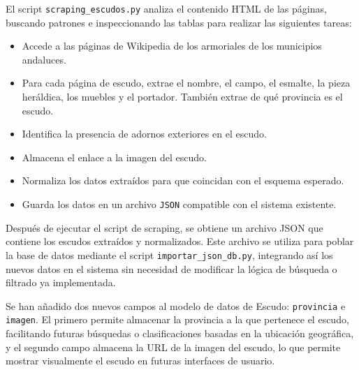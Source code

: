 El script \texttt{scraping{}\_escudos.py} analiza el contenido HTML de las páginas, buscando patrones e inspeccionando 
las tablas para realizar las siguientes tareas:

\begin{itemize}
    \item Accede a las páginas de Wikipedia de los armoriales de los municipios andaluces.
    \item Para cada página de escudo, extrae el nombre,  el campo, el esmalte, la pieza heráldica, los muebles y el 
    portador. También extrae de qué provincia es el escudo.
    \item Identifica la presencia de adornos exteriores en el escudo.
    \item Almacena el enlace a la imagen del escudo.
    \item Normaliza los datos extraídos para que coincidan con el esquema esperado.
    \item Guarda los datos en un archivo \texttt{JSON} compatible con el sistema existente.
\end{itemize}

Después de ejecutar el script de scraping, se obtiene un archivo JSON que contiene los escudos extraídos y normalizados. Este archivo se 
utiliza para poblar la base de datos mediante el script \texttt{importar{}\_json{}\_db.py}, integrando así los nuevos datos en el sistema 
sin necesidad de modificar la lógica de búsqueda o filtrado ya implementada.

Se han añadido dos nuevos campos al modelo de datos de Escudo: \texttt{provincia} e \texttt{imagen}. El primero permite almacenar la provincia
a la que pertenece el escudo, facilitando futuras búsquedas o clasificaciones basadas en la ubicación geográfica, y el segundo campo almacena 
la URL de la imagen del escudo, lo que permite mostrar visualmente el escudo en futuras interfaces de usuario.
